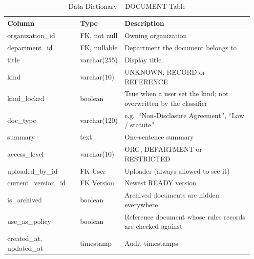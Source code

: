 \begin{table}[H]\centering\small
\caption{Data Dictionary -- DOCUMENT Table}\label{tab:dd-doc}
\begin{tabularx}{\textwidth}{|p{3.2cm}|p{2.6cm}|X|}\hline
\textbf{Column} & \textbf{Type} & \textbf{Description} \\ \hline
organization\_id & FK, not null & Owning organization \\ \hline
department\_id & FK, nullable & Department the document belongs to \\ \hline
title & varchar(255) & Display title \\ \hline
kind & varchar(10) & UNKNOWN, RECORD or REFERENCE \\ \hline
kind\_locked & boolean & True when a user set the kind; not overwritten by the classifier \\ \hline
doc\_type & varchar(120) & e.g.\ ``Non-Disclosure Agreement'', ``Law / statute'' \\ \hline
summary & text & One-sentence summary \\ \hline
access\_level & varchar(10) & ORG, DEPARTMENT or RESTRICTED \\ \hline
uploaded\_by\_id & FK User & Uploader (always allowed to see it) \\ \hline
current\_version\_id & FK Version & Newest READY version \\ \hline
is\_archived & boolean & Archived documents are hidden everywhere \\ \hline
use\_as\_policy & boolean & Reference document whose rules records are checked against \\ \hline
created\_at, updated\_at & timestamp & Audit timestamps \\ \hline
\end{tabularx}
\end{table}

